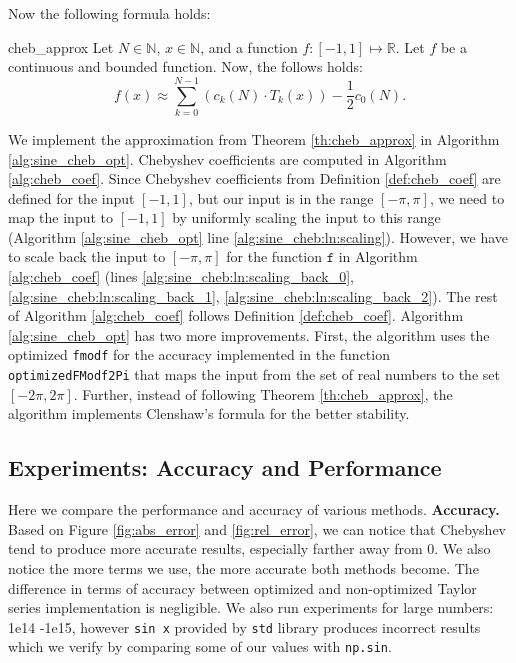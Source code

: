 \documentclass[12pt]{article}
\begin{document}
Now the following formula holds:
\begin{TheoremColor}{}{cheb_approx}
    Let $N \in \mathbb{N}$, $x \in \mathbb{N}$, and a function $f : [-1, 1] \mapsto \mathbb{R}$.
    Let $f$ be a continuous and bounded function. Now, the follows holds:
    \begin{equation*}
        f(x) \approx \sum_{k=0}^{N-1} \left(c_k(N) \cdot T_k(x)\right) - \frac{1}{2} c_0(N).
    \end{equation*}
\end{TheoremColor}

We implement the approximation from Theorem \ref{th:cheb_approx} in Algorithm \ref{alg:sine_cheb_opt}.
Chebyshev coefficients are computed in Algorithm \ref{alg:cheb_coef}.
Since Chebyshev coefficients from Definition \ref{def:cheb_coef} are defined for the input $[-1, 1]$, but our input is in the range $[-\pi, \pi]$, we need to map the input to $[-1, 1]$ by uniformly scaling the input to this range (Algorithm \ref{alg:sine_cheb_opt} line \ref{alg:sine_cheb:ln:scaling}).
However, we have to scale back the input to $[-\pi, \pi]$ for the function $\texttt{f}$ in Algorithm \ref{alg:cheb_coef} (lines \ref{alg:sine_cheb:ln:scaling_back_0}, \ref{alg:sine_cheb:ln:scaling_back_1}, \ref{alg:sine_cheb:ln:scaling_back_2}).
The rest of Algorithm \ref{alg:cheb_coef} follows Definition \ref{def:cheb_coef}.
Algorithm \ref{alg:sine_cheb_opt} has two more improvements.
First, the algorithm uses the optimized \texttt{fmodf} for the accuracy implemented in the function \texttt{optimizedFModf2Pi} that maps the input from the set of real numbers to the set $[-2 \pi, 2 \pi]$.
Further, instead of following Theorem \ref{th:cheb_approx}, the algorithm implements Clenshaw's formula \cite[p~.237]{press2007numerical} for the better stability.


\newpage
\subsection{Experiments: Accuracy and Performance}
Here we compare the performance and accuracy of various methods.
\textbf{Accuracy.}
Based on Figure \ref{fig:abs_error} and \ref{fig:rel_error}, we can notice that Chebyshev tend to produce more accurate results, especially farther away from 0. We also notice the more terms we use, the more accurate both methods become. The difference in terms of accuracy between optimized and non-optimized Taylor series implementation is negligible.
We also run experiments for large numbers: 1e14 -1e15, however \texttt{sin x} provided by \texttt{std} library produces incorrect results which we verify by comparing some of our values with \texttt{np.sin}.
\end{document}
